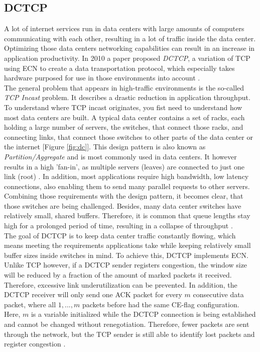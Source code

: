 \documentclass[a4paper,conference]{IEEEtran}
\begin{document}
\subsection{DCTCP}
\label{sec:DCTCP}
A lot of internet services run in data centers with large amounts of computers communicating with each other, resulting in a lot of traffic inside the data center. Optimizing those data centers networking capabilities can result in an increase in application productivity. In 2010 a paper proposed \textit{DCTCP}, a variation of TCP using ECN to create a data transportation protocol, which especially takes hardware purposed for use in those environments into account \cite{10.1145/1851275.1851192}.\\
The general problem that appears in high-traffic environments is the so-called \textit{TCP Incast} problem. It describes a drastic reduction in application throughput. To understand where TCP incast originates, you fist need to understand how most data centers are built. A typical data center contains a set of racks, each holding a large number of servers, the switches, that connect those racks, and connecting links, that connect those switches to other parts of the data center or the internet [Figure \ref{fig:dc}]. This design pattern is also known as \textit{Partition/Aggregate} and is most commonly used in data centers. It however results in a high 'fan-in', as multiple servers (leaves) are connected to just one link (root) \cite{10.1145/1851275.1851192,10.1145/1592681.1592693}. In addition, most applications require high bandwidth, low latency connections, also enabling them to send many parallel requests to other servers. Combining those requirements with the design pattern, it becomes clear, that those switches are being challenged. Besides, many data center switches have relatively small, shared buffers. Therefore, it is common that queue lengths stay high for a prolonged period of time, resulting in a collapse of throughput \cite{10.1145/1851275.1851192,10.1145/1592681.1592693}.\\
The goal of DCTCP is to keep data center traffic constantly flowing, which means meeting the requirements applications take while keeping relatively small buffer sizes inside switches in mind. To achieve this, DCTCP implements ECN. Unlike TCP however, if a DCTCP sender registers congestion, the window size will be reduced by a fraction of the amount of marked packets it received. Therefore, excessive link underutilization can be prevented. In addition, the DCTCP receiver will only send one ACK packet for every $m$ consecutive data packet, where all $1,...,m$ packets before had the same CE-flag configuration. Here, $m$ is a variable initialized while the DCTCP connection is being established and cannot be changed without renegotiation. Therefore, fewer packets are sent through the network, but the TCP sender is still able to identify lost packets and register congestion \cite{10.1145/1851275.1851192}.
\end{document}
